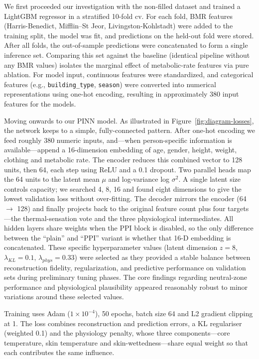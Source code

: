 We first proceeded our investigation with the non-filled dataset and trained a LightGBM regressor in a stratified 10-fold \gls{cv}. For each fold, BMR features (Harris-Benedict, Mifflin–St Jeor, Livingston-Kohlstadt) were added to the training split, the model was fit, and predictions on the held-out fold were stored. After all folds, the out-of-sample predictions were concatenated to form a single inference set. Comparing this set against the baseline (identical pipeline without any BMR values) isolates the marginal effect of metabolic-rate features via pure ablation. For model input, continuous features were standardized, and categorical features (e.g., \texttt{building\_type}, \texttt{season}) were converted into numerical representations using one-hot encoding, resulting in approximately 380 input features for the models.

Moving onwards to our PINN model. As illustrated in Figure~\ref{fig:diagram-losses}, the network keeps to a simple, fully-connected pattern. After one-hot encoding we feed roughly 380 numeric inputs, and—when person-specific information is available—append a 16-dimension embedding of age, gender, height, weight, clothing and metabolic rate.  The encoder reduces this combined vector to 128 units, then 64, each step using ReLU and a 0.1 dropout.  Two parallel heads map the 64 units to the latent mean $\mu$ and log-variance log $\sigma^2$.  A single latent size controls capacity; we searched {4, 8, 16} and found eight dimensions to give the lowest validation loss without over-fitting.  The decoder mirrors the encoder (64 $\rightarrow$ 128) and finally projects back to the original feature count plus four targets—the thermal-sensation vote and the three physiological intermediates.  All hidden layers share weights when the PPI block is disabled, so the only difference between the “plain” and “PPI” variant is whether that 16-D embedding is concatenated. These specific hyperparameter values (latent dimension $z=8$, $\lambda_{KL}=0.1$, $\lambda_{phys}=0.33$) were selected as they provided a stable balance between reconstruction fidelity, regularization, and predictive performance on validation sets during preliminary tuning phases. The core findings regarding neutral-zone performance and physiological plausibility appeared reasonably robust to minor variations around these selected values.

Training uses Adam ($1\times10^{-4}$), 50 epochs, batch size 64 and L2 gradient clipping at 1.  The loss combines reconstruction and prediction errors, a KL regulariser (weighted 0.1) and the physiology penalty, whose three components—core temperature, skin temperature and skin-wettedness—share equal weight so that each contributes the same influence.

